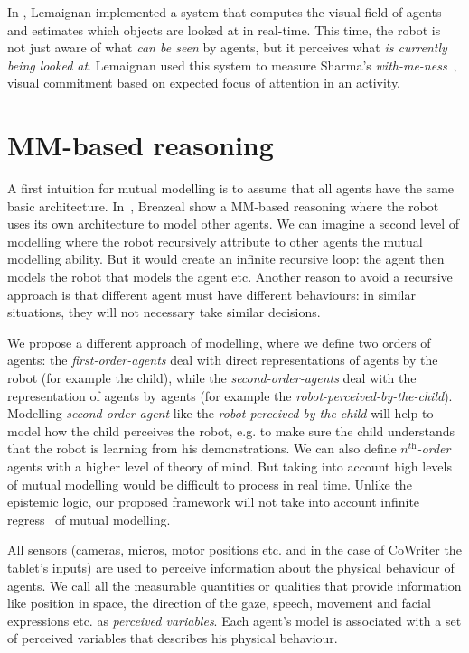 \documentclass[conference]{IEEEtran}
\begin{document}
In \cite{lemaignan2016realtime}, Lemaignan implemented a system that computes the visual field of agents and estimates which objects are looked at in real-time. This time, the robot is not just aware of what \textit{can be seen} by agents, but it perceives what \textit{is currently being looked at}. Lemaignan used this system to measure Sharma's \textit{with-me-ness}~\cite{sharma2014me}, visual commitment based on expected focus of attention in an activity. 

\section{MM-based reasoning}
A first intuition for mutual modelling is to assume that all agents have the same basic architecture. In~\cite{breazeal2006using}, Breazeal show a MM-based reasoning where the robot uses its own architecture to model other agents. We can imagine a second level of modelling where the robot recursively attribute to other agents the mutual modelling ability. But it would create an infinite recursive loop: the agent then models the robot that models the agent etc. Another reason to avoid a recursive approach is that different agent must have different behaviours: in similar situations, they will not necessary take similar decisions. 

We propose a different approach of modelling, where we define two orders of agents: the \textit{first-order-agents} deal with direct representations of agents by the robot (for example the child), while the \textit{second-order-agents} deal with the representation of agents by agents (for example the \textit{robot-perceived-by-the-child}). 
Modelling \textit{second-order-agent} like the \textit{robot-perceived-by-the-child} will help to model how the child perceives the robot, e.g. to make sure the child understands that the robot is learning from his demonstrations. 
We can also define \textit{$n^{\textit{th}}$-order} agents with a higher level of theory of mind. But taking into account high levels of mutual modelling would be difficult to process in real time. Unlike the epistemic logic, our proposed framework will not take into account infinite regress~\cite{clark1991grounding} of mutual modelling.

All sensors (cameras, micros, motor positions etc. and in the case of CoWriter the tablet's inputs) are used to perceive information about the physical behaviour of agents. 
We call all the measurable quantities or qualities that provide information like position in space, the direction of the gaze, speech, movement and facial expressions etc. as \textit{perceived variables}. 
Each agent's model is associated with a set of perceived variables that describes his physical behaviour.
\end{document}
